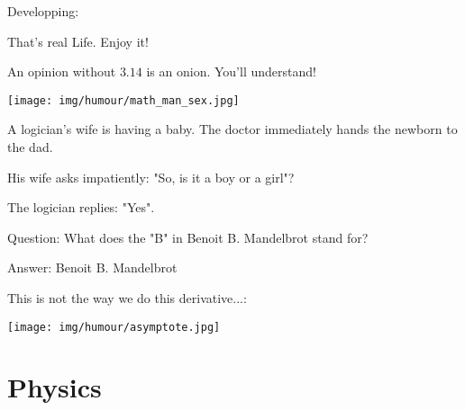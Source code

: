 	Developping:
	
	That's real Life. Enjoy it!
	
	\begin{center}\underline{\hspace{5 cm}}\end{center}
	An opinion without $3.14$ is an onion. You'll understand!
	
	\begin{center}\underline{\hspace{5 cm}}\end{center}

	\begin{center}
		\texttt{[image: img/humour/math\_man\_sex.jpg]}	
	\end{center}
	
	\begin{center}\underline{\hspace{5 cm}}\end{center}
	
	A logician's wife is having a baby. The doctor immediately hands the newborn to the dad.
	
	His wife asks impatiently: "So, is it a boy or a girl"?
	
	The logician replies: "Yes".

	\begin{center}\underline{\hspace{5 cm}}\end{center}
	Question: What does the "B" in Benoit B. Mandelbrot stand for?	
	
	Answer: Benoit B. Mandelbrot
	
	\begin{center}\underline{\hspace{5 cm}}\end{center}
	
	This is not the way we do this derivative...:
	
	
	\begin{center}\underline{\hspace{5 cm}}\end{center}

	\begin{center}
		\texttt{[image: img/humour/asymptote.jpg]}	
	\end{center}

	\pagebreak
	\section{Physics}
	
